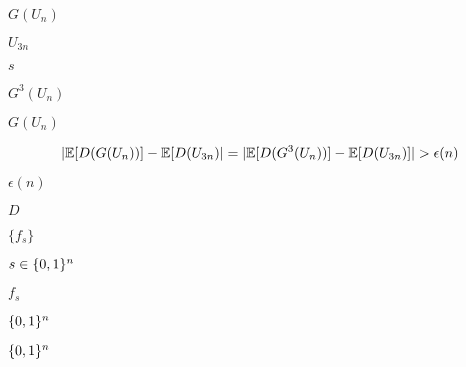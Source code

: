 \documentclass[10pt]{book}
\begin{document}
\begin{mdSnippets}
\begin{mdInlineSnippet}[6a41bb09ce9518d55e93d2c85b657b91]%
$G(U_n)$\end{mdInlineSnippet}%
\begin{mdInlineSnippet}[f0a24fb1c0ccae60c023621d1a1150f0]%
$U_{3n}$\end{mdInlineSnippet}%
\begin{mdInlineSnippet}[03c7c0ace395d80182db07ae2c30f034]%
$s$\end{mdInlineSnippet}%
\begin{mdInlineSnippet}[5a0863e38f0e40856fa892f3d84f0545]%
$G^3(U_n)$\end{mdInlineSnippet}%
\begin{mdInlineSnippet}[6a41bb09ce9518d55e93d2c85b657b91]%
$G(U_n)$\end{mdInlineSnippet}%
\begin{mdDisplaySnippet}[e76a4f9bc3f05004b5dc46bd120d22c4]%
\[%
|\E[D(G(U_n))] - \E[D(U_{3n})| = |\E[D(G^3(U_n))] - \E[D(U_{3n})]| > \epsilon(n)  
\]%
\end{mdDisplaySnippet}%
\begin{mdInlineSnippet}[6d0c1b4d1364086cf8ee344445ebe2b4]%
$\epsilon(n)$\end{mdInlineSnippet}%
\begin{mdInlineSnippet}[f623e75af30e62bbd73d6df5b50bb7b5]%
$D$\end{mdInlineSnippet}%
\begin{mdInlineSnippet}[37a2ce8e5337ae1139e64a8ff1f2f6bb]%
$\{ f_s \}$\end{mdInlineSnippet}%
\begin{mdInlineSnippet}[43bee3665f89f73af01ef178208a8224]%
$s\in\{0,1\}^n$\end{mdInlineSnippet}%
\begin{mdInlineSnippet}[983340c663380eacde4a09812e2e3c2c]%
$f_s$\end{mdInlineSnippet}%
\begin{mdInlineSnippet}[5867c9b098884eca2779f6d98d4b0b29]%
$\{0,1\}^n$\end{mdInlineSnippet}%
\begin{mdInlineSnippet}[5867c9b098884eca2779f6d98d4b0b29]%
$\{0,1\}^n$\end{mdInlineSnippet}%

\end{mdSnippets}
\end{document}
